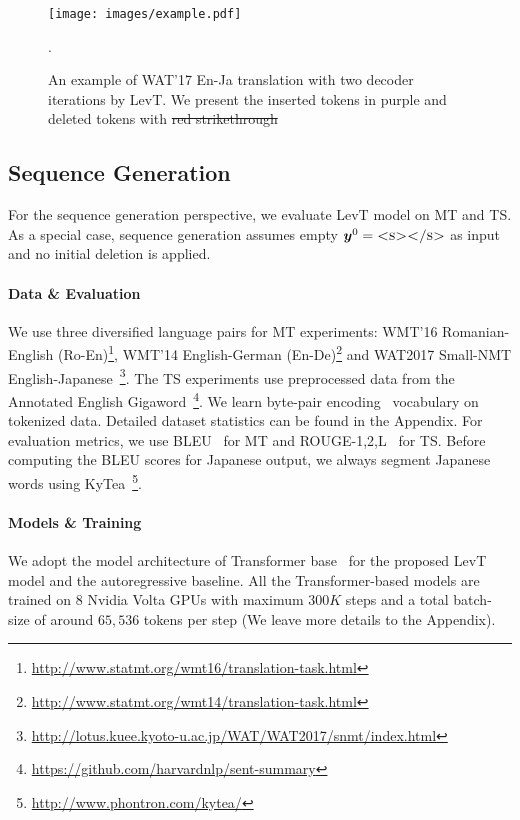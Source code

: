 \documentclass{article}
\begin{document}
\begin{figure}[t]
    \centering
    \texttt{[image: images/example.pdf]}
    \caption{\label{fig.example}An example of WAT'17 En-Ja translation with two decoder iterations by LevT. We present the inserted tokens in {\color{purple} purple} and deleted tokens with {\color{red} \sout{red strikethrough}}}.
    \vspace{-5pt}
\end{figure}
\subsection{Sequence Generation}
\label{sec.gen}
For the sequence generation perspective, we evaluate LevT model on MT and TS. As a special case, sequence generation assumes empty $\bm{y}^0=\textsc{<s></s>}$ as input and no initial deletion is applied. 

\paragraph{Data \& Evaluation} 
We use three diversified language pairs for MT experiments: WMT'16 Romanian-English (Ro-En)\footnote{\url{http://www.statmt.org/wmt16/translation-task.html}}, WMT'14 English-German (En-De)\footnote{\url{http://www.statmt.org/wmt14/translation-task.html}} and WAT2017 Small-NMT English-Japanese~\citep[En-Ja,][]{nakazawa-etal-2017-overview}\footnote{\url{http://lotus.kuee.kyoto-u.ac.jp/WAT/WAT2017/snmt/index.html}}. The TS experiments use preprocessed data from the Annotated English Gigaword~\citep[Gigaword,][]{rush2015neural}\footnote{\url{https://github.com/harvardnlp/sent-summary}}. 
We learn byte-pair encoding~\citep[BPE,][]{sennrich2015neural} vocabulary on tokenized data.
Detailed dataset statistics can be found in the Appendix. For evaluation metrics, we use BLEU~\citep{papineni2002bleu} for MT and ROUGE-1,2,L~\citep{lin:2004:ACLsummarization} for TS. Before computing the BLEU scores for Japanese output, we always segment Japanese words using KyTea~\footnote{\url{http://www.phontron.com/kytea/}}.

\paragraph{Models \& Training} We adopt the model architecture of Transformer base~\citep{vaswani2017attention} for the proposed LevT model and the autoregressive baseline. 
All the Transformer-based models are trained on $8$ Nvidia Volta GPUs with maximum $300K$ steps and a total batch-size of around $65,536$ tokens per step (We leave more details to the Appendix).
\end{document}
